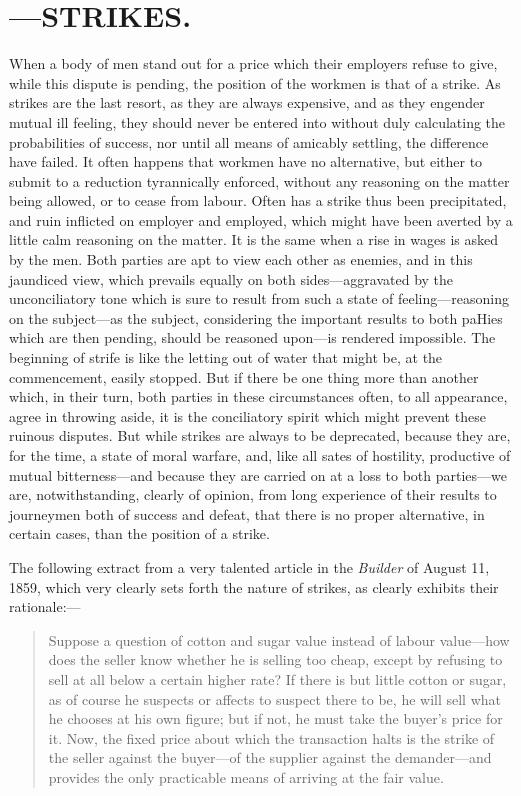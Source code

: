 \chapter{---STRIKES.} \label{STRIKES}

When a body of men stand out for a price which their employers refuse to
give, while this dispute is pending, the position of the workmen is that
of a strike. As strikes are the last resort, as they are always
expensive, and as they engender mutual ill feeling, they should never be
entered into without duly calculating the probabilities of success, nor
until all means of amicably settling, the difference have failed. It
often happens that workmen have no alternative, but either to submit to
a reduction tyrannically enforced, without any reasoning on the matter
being allowed, or to cease from labour. Often has a strike thus been
precipitated, and ruin inflicted on employer and employed, which might
have been averted by a little calm reasoning on the matter. It is the
same when a rise in wages is asked by the men. Both parties are apt to
view each other as enemies, and in this jaundiced view, which prevails
equally on both sides---aggravated by the unconciliatory tone which is
sure to result from such a state of feeling---reasoning on the
subject---as the subject, considering the important results to both
paHies which are then pending, should be reasoned upon---is rendered
impossible. The beginning of strife is like the letting out of water
that might be, at the commencement, easily stopped. But if there be one
thing more than another which, in their turn, both parties in these
circumstances often, to all appearance, agree in throwing aside, it is
the conciliatory spirit which might prevent these ruinous disputes. But
while strikes are always to be deprecated, because they are, for the
time, a state of moral warfare, and, like all sates of hostility,
productive of mutual bitterness---and because they are carried on at a
loss to both parties---we are, notwithstanding, clearly of opinion, from
long experience of their results to journeymen both of success and
defeat, that there is no proper alternative, in certain cases, than the
position of a strike.

The following extract from a very talented article in the
\textit{Builder} of August 11, 1859, which very clearly sets forth the
nature of strikes, as clearly exhibits their rationale:---

\begin{quote}
    \hspace{2em} Suppose a question of cotton and sugar value instead of
    labour value---how does the seller know whether he is selling too
    cheap, except by refusing to sell at all below a certain higher
    rate? If there is but little cotton or sugar, as of course he
    suspects or affects to suspect there to be, he will sell what he
    chooses at his own figure; but if not, he must take the buyer's
    price for it. Now, the fixed price about which the transaction halts
    is the strike of the seller against the buyer---of the supplier
    against the demander---and provides the only practicable means of
    arriving at the fair value.
\end{quote}


